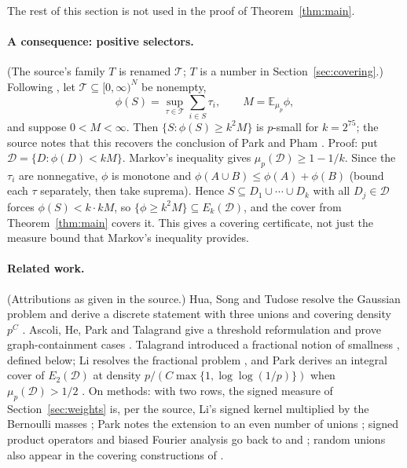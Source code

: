\documentclass[11pt,letterpaper]{article}
\theoremstyle{definition}
\theoremstyle{remark}
\numberwithin{equation}{section}
\begin{document}
The rest of this section is not used in the proof of
Theorem~\ref{thm:main}.

\paragraph{A consequence: positive selectors.}
(The source's family $T$ is renamed $\mathcal T$; $T$ is a number in
Section~\ref{sec:covering}.) Following \cite[Section~7]{Talagrand10}, let
$\mathcal T\subseteq[0,\infty)^N$ be nonempty,
\[
\phi(S)=\sup_{\tau\in\mathcal T}\sum_{i\in S}\tau_i,
\qquad M=\mathbb E_{\mu_p}\phi,
\]
and suppose $0<M<\infty$. Then $\{S:\phi(S)\ge k^2M\}$ is $p$-small for
$k=2^{75}$; the source notes that this recovers the conclusion of Park
and Pham \cite[Theorem~1.2]{ParkPham24}. Proof: put
$\mathcal D=\{D:\phi(D)<kM\}$. Markov's inequality gives
$\mu_p(\mathcal D)\ge1-1/k$. Since the $\tau_i$ are nonnegative, $\phi$
is monotone and $\phi(A\cup B)\le\phi(A)+\phi(B)$ (bound each $\tau$
separately, then take suprema). Hence
$S\subseteq D_1\cup\cdots\cup D_k$ with all $D_j\in\mathcal D$ forces
$\phi(S)<k\cdot kM$, so $\{\phi\ge k^2M\}\subseteq E_k(\mathcal D)$, and
the cover from Theorem~\ref{thm:main} covers it. This gives a covering
certificate, not just the measure bound that Markov's inequality provides.

\paragraph{Related work.}
(Attributions as given in the source.) Hua, Song and Tudose resolve the
Gaussian problem and derive a discrete statement with three unions and
covering density $p^C$ \cite[Corollaries~1.3--1.4]{HuaSongTudose26}.
Ascoli, He, Park and Talagrand give a threshold reformulation and prove
graph-containment cases
\cite[Proposition~1.5 and Theorems~1.10--1.13]{AscoliEtAl26}. Talagrand
introduced a fractional notion of smallness
\cite[Sections~6 and~7]{Talagrand10}, defined below; Li resolves the
fractional problem \cite[Theorem~1.9]{Li26}, and Park derives an integral
cover of $E_2(\mathcal D)$ at density $p/(C\max\{1,\log\log(1/p)\})$ when
$\mu_p(\mathcal D)>1/2$ \cite[Corollary~3.5]{Park26}. On methods: with
two rows, the signed measure of Section~\ref{sec:weights} is, per the
source, Li's signed kernel multiplied by the Bernoulli masses
\cite[Section~2]{Li26}; Park notes the extension to an even number of
unions \cite[Corollary~3.5, footnote~3]{Park26}; signed product operators
and biased Fourier analysis go back to \cite[Section~2.2]{Friedgut08} and
\cite[Sections~2.2 and~4.1]{EllisFilmusFriedgut12}; random unions also
appear in the covering constructions of
\cite[Sections~1.1 and~2]{FischerPerson25}.
\end{document}
